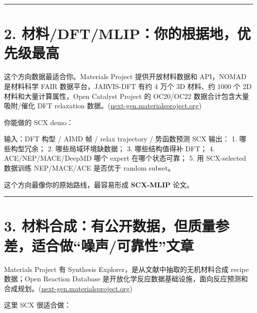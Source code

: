 \documentclass[
  12pt,
]{ctexart}
\newenvironment{Shaded}{}{}
\newcommand{\NormalTok}[1]{#1}
\begin{document}
\begin{center}\rule{0.5\linewidth}{0.5pt}\end{center}

\section{2.
材料/DFT/MLIP：你的根据地，优先级最高}\label{ux6750ux6599dftmlipux4f60ux7684ux6839ux636eux5730ux4f18ux5148ux7ea7ux6700ux9ad8}

这个方向数据最适合你。Materials Project 提供开放材料数据和 API，NOMAD
是材料科学 FAIR 数据平台，JARVIS-DFT 有约 4 万个 3D 材料、约 1000 个 2D
材料和大量计算属性，Open Catalyst Project 的 OC20/OC22
数据合计包含大量吸附/催化 DFT relaxation
数据。(\href{https://next-gen.materialsproject.org/api?utm_source=chatgpt.com}{next-gen.materialsproject.org})

你能做的 SCX demo：

\begin{Shaded}
\begin{Highlighting}[]
\NormalTok{输入：DFT 构型 / AIMD 帧 / relax trajectory / 势函数预测}
\NormalTok{SCX 输出：}
\NormalTok{1. 哪些构型冗余；}
\NormalTok{2. 哪些局域环境缺数据；}
\NormalTok{3. 哪些结构值得补 DFT；}
\NormalTok{4. ACE/NEP/MACE/DeepMD 哪个 expert 在哪个状态可靠；}
\NormalTok{5. 用 SCX{-}selected 数据训练 NEP/MACE/ACE 是否优于 random subset。}
\end{Highlighting}
\end{Shaded}

这个方向最像你的原始路线，最容易形成 \textbf{SCX-MLIP} 论文。

\begin{center}\rule{0.5\linewidth}{0.5pt}\end{center}

\section{3.
材料合成：有公开数据，但质量参差，适合做``噪声/可靠性''文章}\label{ux6750ux6599ux5408ux6210ux6709ux516cux5f00ux6570ux636eux4f46ux8d28ux91cfux53c2ux5deeux9002ux5408ux505aux566aux58f0ux53efux9760ux6027ux6587ux7ae0}

Materials Project 有 Synthesis Explorer，是从文献中抽取的无机材料合成
recipe 数据；Open Reaction Database
是开放化学反应数据基础设施，面向反应预测和合成规划。(\href{https://next-gen.materialsproject.org/synthesis?utm_source=chatgpt.com}{next-gen.materialsproject.org})

这里 SCX 很适合做：
\end{document}
